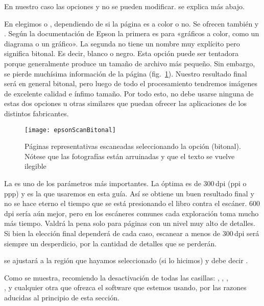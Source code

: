 \documentclass[%
	a5paper,
	10pt,
	twoside,
	openright,
	final,
]{memoir}
\begin{document}
	En nuestro caso las opciones  y  no se pueden modificar.  se explica más abajo.

	En  elegimos  o , dependiendo de si la página es a color o no. Se ofrecen también  y . Según la documentación de Epson la primera es para «gráficos a color, como un diagrama o un gráfico». La segunda no tiene un nombre muy explícito pero significa bitonal. Es decir, blanco o negro. Esta opción puede ser tentadora porque generalmente produce un tamaño de archivo más pequeño. Sin embargo, se pierde muchísima información de la página (fig.~\ref{fig:epsonScanBitonal}). Nuestro resultado final será en general bitonal, pero luego de todo el procesamiento tendremos imágenes de excelente calidad e ínfimo tamaño. Por todo esto, no debe usarse ninguna de estas dos opciones u otras similares que puedan ofrecer las aplicaciones de los distintos fabricantes.

	\begin{figure}
		\texttt{[image: epsonScanBitonal]}
		\caption[Páginas representativas escaneadas en bitonal]{Páginas representativas escaneadas seleccionando la opción  (bitonal). Nótese que las fotografías están arruinadas y que el texto se vuelve ilegible\label{fig:epsonScanBitonal}}
	\end{figure}

	La  es uno de los parámetros más importantes. La óptima es de 300\,dpi (ppi o ppp) y es la que usaremos en esta guía. Así se obtiene un buen resultado final y no se hace eterno el tiempo que se está presionando el libro contra el escáner. 600\,dpi sería aún mejor, pero en los escáneres comunes cada exploración toma mucho más tiempo. Valdrá la pena solo para páginas con un nivel muy alto de detalles. Si bien la elección final dependerá de cada caso, escanear a menos de 300\,dpi será siempre un desperdicio, por la cantidad de detalles que se perderán.

	 se ajustará a la región que hayamos seleccionado (si lo hicimos) y  debe decir .

	Como se muestra, recomiendo la desactivación de todas las casillas: , , ,\\,  y cualquier otra que ofrezca el software que estemos usando, por las razones aducidas al principio de esta sección.
\end{document}
